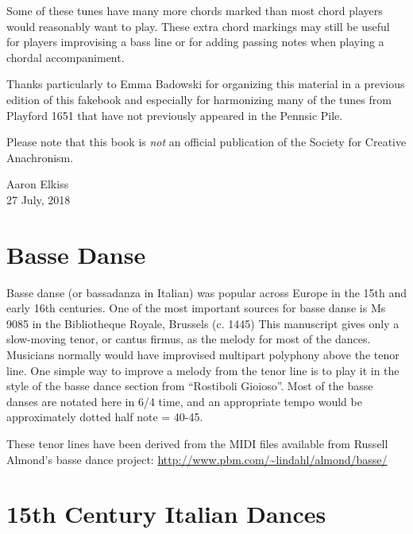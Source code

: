 \documentclass[11pt]{book}
\begin{document}
Some of these tunes have many more chords marked than most chord players would
reasonably want to play. These extra chord markings may still be useful for
players improvising a bass line or for adding passing notes when playing a
chordal accompaniment.

Thanks particularly to Emma Badowski for organizing this material in a previous
edition of this fakebook and especially for harmonizing many of the tunes from
Playford 1651 that have not previously appeared in the Pennsic Pile.

Please note that this book is {\em not} an official publication of the Society
for Creative Anachronism.

Aaron Elkiss \\
27 July, 2018

\clearpage
\begin{multicols}{2}

\renewcommand\cftchapafterpnum{\vskip\baselineskip}
\setlength{\cftsubsecindent}{0pt}
\setlength{\cftsubsecnumwidth}{0pt}
\tableofcontents
\end{multicols}

\clearpage
\mainmatter
\renewcommand{\abcwidth}{1.0\linewidth}

\chapter{Basse Danse}

Basse danse (or bassadanza in Italian) was popular across Europe in the 15th
and early 16th centuries. One of the most important sources for basse danse is
Ms 9085 in the Bibliotheque Royale, Brussels (c. 1445) This manuscript gives
only a slow-moving tenor, or cantus firmus, as the melody for most of the
dances. Musicians normally would have improvised multipart polyphony above the
tenor line. One simple way to improve a melody from the tenor line is to play
it in the style of the basse dance section from ``Rostiboli Gioioso''.  Most of
the basse danses are notated here in 6/4 time, and an appropriate tempo would
be approximately dotted half note = 40-45.

These tenor lines have been derived from the MIDI files available from Russell
Almond's basse dance project: \url{http://www.pbm.com/~lindahl/almond/basse/}

\clearpage



\chapter{15th Century Italian Dances}
\end{document}
